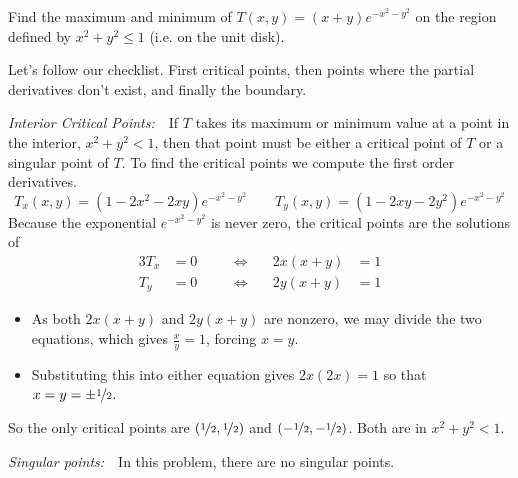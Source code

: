 \begin{eg}\label{eg:MXMNabsA}
Find the maximum and minimum of $T(x,y)=(x+y)e^{-x^2-y^2}$
on the region defined by $x^2+y^2\le 1$ (i.e. on the unit disk).

\soln 
Let's follow our checklist. First critical points, then points where
the partial derivatives don't exist, and finally the boundary.

\noindent\emph{Interior Critical Points:}\ \ 
If $T$ takes its maximum or minimum value at a point in the interior, 
$x^2+y^2<1$, then that point must be either a critical point of $T$ or a singular point of $T$.
To find the critical points we compute the first order derivatives.
\begin{equation*}
T_x(x,y)=(1-2x^2-2xy)e^{-x^2-y^2}\qquad
T_y(x,y)=(1-2xy-2y^2)e^{-x^2-y^2}
\end{equation*}
Because the exponential $e^{-x^2-y^2}$ is never zero, 
the critical points are the solutions of
\begin{alignat*}{3}
T_x&=0 &\quad&\iff\quad & 2x(x+y)&=1 \\
T_y&=0 & &\iff & 2y(x+y)&=1  
\end{alignat*}
\begin{itemize}
\item
As both $2x(x+y)$ and $2y(x+y)$ are nonzero, we may divide the 
two equations, which gives $\frac{x}{y}=1$, forcing $x=y$. 
\item
Substituting this into either
equation gives $2x(2x)=1$ so that $x=y=\pm\nicefrac{1}{2}$.
\end{itemize}
So the only critical points are $(\nicefrac{1}{2},\nicefrac{1}{2})$ 
and $(-\nicefrac{1}{2},-\nicefrac{1}{2})$. Both are in $x^2+y^2<1$.

\smallskip
\noindent\emph{Singular points:}\ \  In this problem, there are no singular 
points.


\end{eg}
